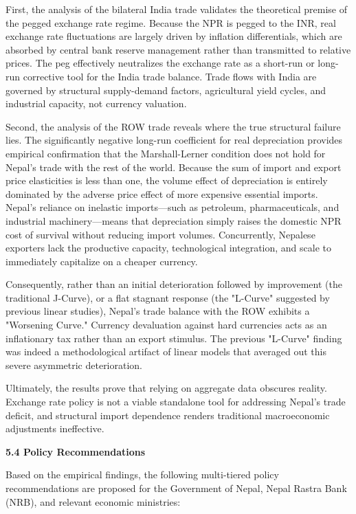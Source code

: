 \documentclass[12pt]{article}
\begin{document}
First, the analysis of the bilateral India trade validates the theoretical premise of the pegged exchange rate regime. Because the NPR is pegged to the INR, real exchange rate fluctuations are largely driven by inflation differentials, which are absorbed by central bank reserve management rather than transmitted to relative prices. The peg effectively neutralizes the exchange rate as a short-run or long-run corrective tool for the India trade balance. Trade flows with India are governed by structural supply-demand factors, agricultural yield cycles, and industrial capacity, not currency valuation.

Second, the analysis of the ROW trade reveals where the true structural failure lies. The significantly negative long-run coefficient for real depreciation provides empirical confirmation that the Marshall-Lerner condition does not hold for Nepal's trade with the rest of the world. Because the sum of import and export price elasticities is less than one, the volume effect of depreciation is entirely dominated by the adverse price effect of more expensive essential imports. Nepal’s reliance on inelastic imports—such as petroleum, pharmaceuticals, and industrial machinery—means that depreciation simply raises the domestic NPR cost of survival without reducing import volumes. Concurrently, Nepalese exporters lack the productive capacity, technological integration, and scale to immediately capitalize on a cheaper currency.

Consequently, rather than an initial deterioration followed by improvement (the traditional J-Curve), or a flat stagnant response (the "L-Curve" suggested by previous linear studies), Nepal's trade balance with the ROW exhibits a "Worsening Curve." Currency devaluation against hard currencies acts as an inflationary tax rather than an export stimulus. The previous "L-Curve" finding was indeed a methodological artifact of linear models that averaged out this severe asymmetric deterioration.

Ultimately, the results prove that relying on aggregate data obscures reality. Exchange rate policy is not a viable standalone tool for addressing Nepal’s trade deficit, and structural import dependence renders traditional macroeconomic adjustments ineffective.

\vspace{0.5cm}
\noindent\textbf{5.4 Policy Recommendations}

Based on the empirical findings, the following multi-tiered policy recommendations are proposed for the Government of Nepal, Nepal Rastra Bank (NRB), and relevant economic ministries:
\end{document}
